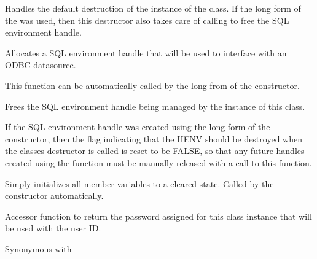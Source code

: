 
Handles the default destruction of the instance of the class.  If the long form
of the  was used, then this destructor
also takes care of calling
 to free the
SQL environment handle.

\label{wxdbconnectinfallochenv}


Allocates a SQL environment handle that will be used to interface with
an ODBC datasource.


This function can be automatically called by the long from of the
 constructor.

\label{wxdbconnectinffreehenv}


Frees the SQL environment handle being managed by the instance of this class.


If the SQL environment handle was created using the long form of the
 constructor, then the flag indicating
that the HENV should be destroyed when the classes destructor is called
is reset to be FALSE, so that any future handles created using the
 function
must be manually released with a call to this function.

\label{wxdbconnectinfinitialize}

Simply initializes all member variables to a cleared state.  Called by
the constructor automatically.

\label{wxdbconnectinfgetauthstr}


Accessor function to return the password assigned for this class
instance that will be used with the user ID.

Synonymous with 

\label{wxdbconnectinfgetdefaultdir}

